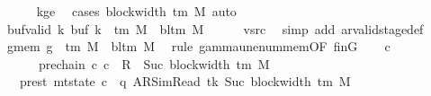 \begin{isabellebody}
\ \ \ \ \isamarkupfalse%
\ kge{}\ \isamarkupfalse%
\ {\isacharparenleft}{\kern0pt}cases\ {\isachardoublequoteopen}block{\isacharunderscore}{\kern0pt}width\ {\isacharparenleft}{\kern0pt}{\isasymGamma}{\isacharunderscore}{\kern0pt}tm\ M{\isacharparenright}{\kern0pt}{\isachardoublequoteclose}{\isacharparenright}{\kern0pt}\ auto\isanewline
\ \ \isamarkupfalse%
\ buf{\isacharunderscore}{\kern0pt}valid{\isacharcolon}{\kern0pt}\ {\isachardoublequoteopen}{\isasymforall}k{\isachardot}{\kern0pt}\ buf\ k\ {\isasymin}\ {\isasymGamma}{\isacharunderscore}{\kern0pt}tm\ M\ {\isasymunion}\ {\isacharbraceleft}{\kern0pt}bl{\isacharunderscore}{\kern0pt}tm\ M{\isacharbraceright}{\kern0pt}{\isachardoublequoteclose}\isanewline
\ \ \ \ \isamarkupfalse%
\ vsrc\ \isamarkupfalse%
\ {\isacharparenleft}{\kern0pt}simp\ add{\isacharcolon}{\kern0pt}\ ar{\isacharunderscore}{\kern0pt}valid{\isacharunderscore}{\kern0pt}stage{\isacharunderscore}{\kern0pt}def{\isacharparenright}{\kern0pt}\isanewline
\ \ \isamarkupfalse%
\ g{}{\isacharunderscore}{\kern0pt}mem{\isacharcolon}{\kern0pt}\ {\isachardoublequoteopen}{\isacharquery}{\kern0pt}g{}\ {\isasymin}\ {\isasymGamma}{\isacharunderscore}{\kern0pt}tm\ M\ {\isasymunion}\ {\isacharbraceleft}{\kern0pt}bl{\isacharunderscore}{\kern0pt}tm\ M{\isacharbraceright}{\kern0pt}{\isachardoublequoteclose}\ \isamarkupfalse%
\ {\isacharparenleft}{\kern0pt}rule\ gamma{\isacharunderscore}{\kern0pt}unenum{\isacharunderscore}{\kern0pt}mem{\isacharbrackleft}{\kern0pt}OF\ finG{\isacharbrackright}{\kern0pt}{\isacharparenright}{\kern0pt}\isanewline
\ \ \isamarkupfalse%
\ c{}\ \isanewline
\ \ \ \ \ \ pre{\isacharunderscore}{\kern0pt}chain{\isacharcolon}{\kern0pt}\ {\isachardoublequoteopen}{\isacharparenleft}{\kern0pt}c{\isacharprime}{\kern0pt}{\isacharcomma}{\kern0pt}\ c{}{\isacharparenright}{\kern0pt}\ {\isasymin}\ R{\isacharprime}{\kern0pt}\ {\isacharcircum}{\kern0pt}{\isacharcircum}{\kern0pt}\ Suc\ {\isacharparenleft}{\kern0pt}block{\isacharunderscore}{\kern0pt}width\ {\isacharparenleft}{\kern0pt}{\isasymGamma}{\isacharunderscore}{\kern0pt}tm\ M{\isacharparenright}{\kern0pt}{\isacharparenright}{\kern0pt}{\isachardoublequoteclose}\isanewline
\ \ \ pre{\isacharunderscore}{\kern0pt}st{\isacharcolon}{\kern0pt}\ {\isachardoublequoteopen}mt{\isacharunderscore}{\kern0pt}state\ c{}\ {\isacharequal}{\kern0pt}\ {\isacharparenleft}{\kern0pt}q{\isacharcomma}{\kern0pt}\ AR{\isacharunderscore}{\kern0pt}SimRead{\isacharcomma}{\kern0pt}\ tk{\isacharcomma}{\kern0pt}\ Suc\ {\isacharparenleft}{\kern0pt}block{\isacharunderscore}{\kern0pt}width\ {\isacharparenleft}{\kern0pt}{\isasymGamma}{\isacharunderscore}{\kern0pt}tm\ M{\isacharparenright}{\kern0pt}{\isacharparenright}{\kern0pt}{\isacharcomma}{\kern0pt}\isanewline

\end{isabellebody}
